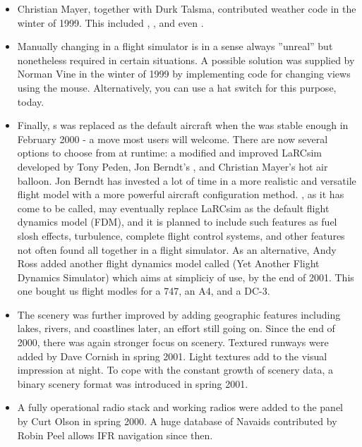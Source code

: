 \begin{itemize}
\item Christian Mayer,   together with Durk Talsma,
contributed weather code in the winter of 1999. This included ,
, and even .

\item Manually changing  in a flight simulator is in a sense always ''unreal'' but
nonetheless required in certain situations. A possible solution was supplied by Norman
Vine in the winter of 1999 by implementing code for changing views
using the mouse. Alternatively, you can use a hat switch for this purpose, today.

\item Finally, s  was replaced as the default aircraft
 when the  was stable enough in February 2000 - a move most users will welcome. There are now several  options to choose from at runtime: a modified and improved LaRCsim  developed by Tony Peden, Jon Berndt's
 , and Christian Mayer's  hot
air balloon. Jon Berndt has invested a lot of time in a more
realistic and versatile flight model with a more powerful aircraft configuration method.
\JSBSim, as it has come to be called, may eventually replace LaRCsim as the default
flight dynamics model (FDM), and it is planned to include such features as fuel slosh
effects, turbulence, complete flight control systems, and other features not often found
all together in a flight simulator. As an alternative, Andy Ross added another flight dynamics model called \YASim{} (Yet Another Flight Dynamics Simulator) which aims at simpliciy of use, by the end of 2001. This one bought us flight modles for a 747, an A4, and a DC-3.

\item The scenery was further improved by adding geographic features including lakes, rivers,
and coastlines later, an effort still going on. Since the end of 2000, there was again
stronger focus on scenery. Textured runways were added by Dave Cornish in spring 2001. Light textures add to the visual impression at night. To cope with
the constant growth of scenery data, a binary scenery format was introduced in spring
2001. 

\item A fully operational radio stack and working radios were added to the panel by Curt
Olson in spring 2000. A huge database of Navaids contributed by Robin
Peel allows IFR navigation since then.


\end{itemize}
